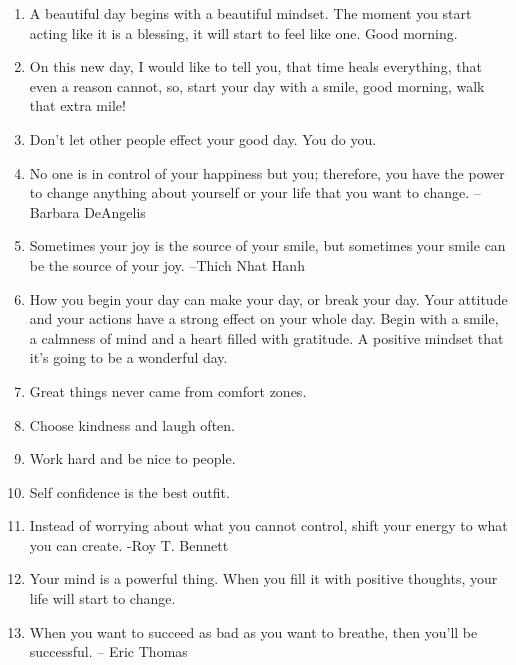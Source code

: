 \begin{enumerate}
            \item A beautiful day begins with a beautiful mindset. The moment you start acting like it is a blessing, it will start to feel like one. Good morning.

            \item On this new day, I would like to tell you, that time heals everything, that even a reason cannot, so, start your day with a smile, good morning, walk that extra mile!

            \item Don’t let other people effect your good day. You do you.

            \item No one is in control of your happiness but you; therefore, you have the power to change anything about yourself or your life that you want to change. – Barbara DeAngelis

            \item Sometimes your joy is the source of your smile, but sometimes your smile can be the source of your joy. –Thich Nhat Hanh

            \item How you begin your day can make your day, or break your day. Your attitude and your actions have a strong effect on your whole day. Begin with a smile, a calmness of mind and a heart filled with gratitude. A positive mindset that it’s going to be a wonderful day.

            \item Great things never came from comfort zones.

            \item Choose kindness and laugh often.

            \item Work hard and be nice to people.

            \item Self confidence is the best outfit.

            \item Instead of worrying about what you cannot control, shift your energy to what you can create. -Roy T. Bennett

            \item Your mind is a powerful thing. When you fill it with positive thoughts, your life will start to change.

            \item When you want to succeed as bad as you want to breathe, then you’ll be successful. – Eric Thomas


\end{enumerate}
